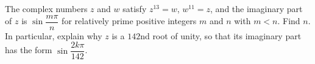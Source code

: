 The complex numbers $z$ and $w$ satisfy $z^{13}=w$, $w^{11}=z$, and the imaginary part of $z$ is $\sin\dfrac{m\pi}{n}$ for relatively prime positive integers $m$ and $n$ with $m<n$. Find $n$. In particular, explain why $z$ is a $142$nd root of unity, so that its imaginary part has the form $\sin\dfrac{2k\pi}{142}$.
